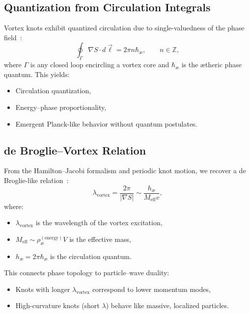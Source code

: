 \subsection*{Quantization from Circulation Integrals}

Vortex knots exhibit quantized circulation due to single-valuedness of the phase field~\cite{Helmholtz1858, faddeev1997stable}:
\begin{equation}
\oint_\Gamma \nabla S \cdot d\vec{\ell} = 2\pi n \hbar_\text{\ae}, \qquad n \in \mathbb{Z},
\end{equation}
where \( \Gamma \) is any closed loop encircling a vortex core and \( \hbar_\text{\ae} \) is the ætheric phase quantum. This yields:
\begin{itemize}
    \item Circulation quantization,
    \item Energy–phase proportionality,
    \item Emergent Planck-like behavior without quantum postulates.
\end{itemize}

\subsection*{de Broglie--Vortex Relation}

From the Hamilton–Jacobi formalism and periodic knot motion, we recover a de Broglie-like relation~\cite{ranada1990topological}:
\begin{equation}
\lambda_\text{vortex} = \frac{2\pi}{|\nabla S|} \sim \frac{h_\text{\ae}}{M_\text{eff} v},
\end{equation}
where:
\begin{itemize}
    \item \( \lambda_\text{vortex} \) is the wavelength of the vortex excitation,
    \item \( M_\text{eff} \sim \rho_\text{\ae}^{(\text{energy})} V \) is the effective mass,
    \item \( h_\text{\ae} = 2\pi \hbar_\text{\ae} \) is the circulation quantum.
\end{itemize}

This connects phase topology to particle–wave duality:
\begin{itemize}
\item Knots with longer \( \lambda_\text{vortex} \) correspond to lower momentum modes,
\item High-curvature knots (short \( \lambda \)) behave like massive, localized particles.
\end{itemize}

